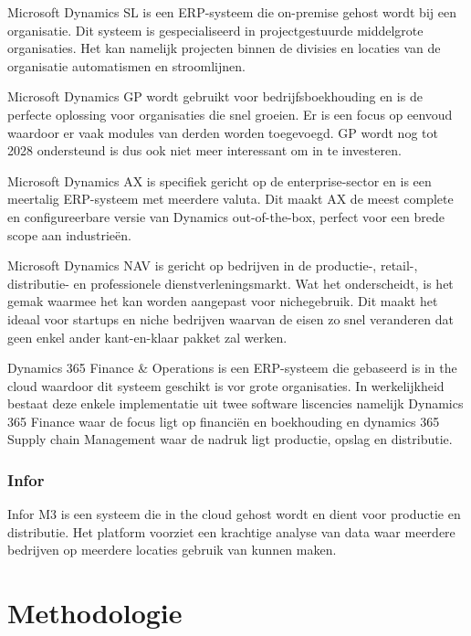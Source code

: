 \documentclass{hogent-article}
\begin{document}
Microsoft Dynamics SL is een ERP-systeem die on-premise gehost wordt bij een organisatie. Dit systeem is gespecialiseerd in projectgestuurde middelgrote organisaties. Het kan namelijk projecten binnen de divisies en locaties van de organisatie automatismen en stroomlijnen. \autocite{Journyx2014}\par

Microsoft Dynamics GP wordt gebruikt voor bedrijfsboekhouding en is de perfecte oplossing voor organisaties die snel groeien. Er is een focus op eenvoud waardoor er vaak modules van derden worden toegevoegd. GP wordt nog tot 2028 ondersteund is dus ook niet meer interessant om in te investeren.\autocite{Journyx2014}\par

Microsoft Dynamics AX is specifiek gericht op de enterprise-sector en is een meertalig ERP-systeem met meerdere valuta. Dit maakt AX de meest complete en configureerbare versie van Dynamics out-of-the-box, perfect voor een brede scope aan industrieën.\autocite{Journyx2014}\par

Microsoft Dynamics NAV is gericht op bedrijven in de productie-, retail-, distributie- en professionele dienstverleningsmarkt. Wat het onderscheidt, is het gemak waarmee het kan worden aangepast voor nichegebruik. Dit maakt het ideaal voor startups en niche bedrijven waarvan de eisen zo snel veranderen dat geen enkel ander kant-en-klaar pakket zal werken. \autocite{Journyx2014}\par

Dynamics 365 Finance & Operations is een ERP-systeem die gebaseerd is in the cloud waardoor dit systeem geschikt is vor grote organisaties. In werkelijkheid bestaat deze enkele implementatie uit twee software liscencies namelijk Dynamics 365 Finance waar de focus ligt op financiën en boekhouding en dynamics 365 Supply chain Management waar de nadruk ligt productie, opslag en distributie.\par

\subsubsection{Infor}
Infor M3 is een systeem die in the cloud gehost wordt en dient voor productie en distributie. Het platform voorziet een krachtige analyse van data waar meerdere bedrijven op meerdere locaties gebruik van kunnen maken. \autocite{Infor2022}\par

\section{Methodologie}
\end{document}
